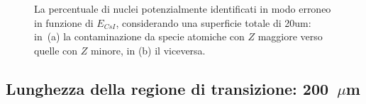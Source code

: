 \begin{figure}[!p] 
	\centering
	\hspace{10mm}
	\caption{La percentuale di nuclei potenzialmente identificati in modo erroneo in funzione di $E_{CsI}$, considerando una superficie totale di 20um: in~(a) la contaminazione da specie atomiche con $Z$ maggiore verso quelle con $Z$ minore, in (b) il viceversa.} \label{fig:leakage_res_20um}
\end{figure}


\subsection*{Lunghezza della regione di transizione: 200~$\mu$m}


